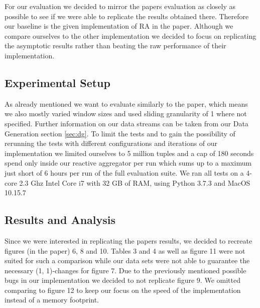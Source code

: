 For our evaluation we decided to mirror the papers evaluation as closely as possible
to see if we were able to replicate the results obtained there.
Therefore our baseline is the given implementation of RA in the paper.
Although we compare ourselves to the other implementation we decided to focus on
replicating the asymptotic results rather than beating the raw performance of their implementation.

\subsection{Experimental Setup}
As already mentioned we want to evaluate similarly to the paper, which means we also mostly varied
window sizes and used sliding granularity of 1 where not specified.
Further information on our data streams can be taken from our Data Generation section \ref{sec:dg}.
To limit the tests and to gain the possibility of rerunning the tests with different configurations
and iterations of our implementation we limited ourselves to 5 million tuples and
a cap of 180 seconds spend only inside our reactive aggregator per run
which sums up to a maximum just short of 6 hours per run of the full evaluation suite.
We ran all tests on a 4-core 2.3 Ghz Intel Core i7 with 32 GB of RAM, using
Python 3.7.3 and MacOS 10.15.7

\subsection{Results and Analysis}
Since we were interested in replicating the papers results, we decided to
recreate figures (in the paper) 6, 8 and 10. Tables 3 and 4 as well as figure 11 were not suited
for such a comparison while our data sets were not able to guarantee the necessary
(1, 1)-changes for figure 7. Due to the previously mentioned possible bugs in our
implementation we decided to not replicate figure 9. We omitted comparing to figure 12
to keep our focus on the speed of the implementation instead of a memory footprint.
